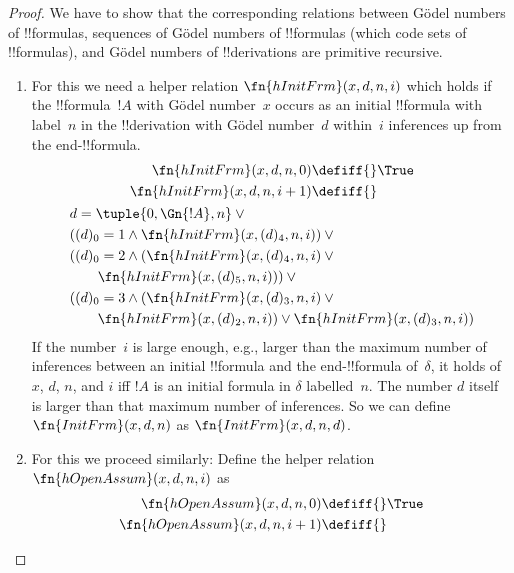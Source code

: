 \documentclass[../../include/open-logic-section]{subfiles}
\begin{document}
\begin{proof}
We have to show that the corresponding relations between G\"odel
numbers of !!{formula}s, sequences of G\"odel numbers of !!{formula}s
(which code sets of !!{formula}s), and G\"odel numbers of !!{derivation}s 
are primitive recursive.
\begin{enumerate}
\item For this we need a helper relation $\fn{hInitFrm}(x, d, n, i)$
  which holds if the !!{formula}~$!A$ with G\"odel number~$x$ occurs
  as an initial !!{formula} with label~$n$ in the !!{derivation} with
  G\"odel number~$d$ within~$i$ inferences up from the
  end-!!{formula}.
  \begin{multline*}
    \begin{aligned}
    \fn{hInitFrm}(x, d, n, 0) \defiff {} & \True\\   
    \fn{hInitFrm}(x, d, n, i+1) \defiff {} &
    \end{aligned}\\
    \begin{aligned}
&  d = \tuple{0, \Gn{!A}, n} \lor {}\\
      & ((d)_0 = 1 \land \fn{hInitFrm}(x, (d)_4, n, i)) \lor {}\\
      & ((d)_0 = 2 \land (\fn{hInitFrm}(x, (d)_4, n, i) \lor {}\\
      & \qquad\fn{hInitFrm}(x, (d)_5, n, i))) \lor {}\\
      & ((d)_0 = 3 \land (\fn{hInitFrm}(x, (d)_3, n, i) \lor {}\\
      & \qquad \fn{hInitFrm}(x, (d)_2, n, i)) \lor
      \fn{hInitFrm}(x, (d)_3, n, i))
\end{aligned}
  \end{multline*}
   If the number~$i$ is large enough, e.g., larger than the maximum
   number of inferences between an initial !!{formula} and the
   end-!!{formula} of~$\delta$, it holds of $x$, $d$, $n$, and $i$ iff
   $!A$ is an initial formula in $\delta$ labelled~$n$.  The number
   $d$ itself is larger than that maximum number of inferences.  So we
   can define $\fn{InitFrm}(x, d, n)$ as $\fn{InitFrm}(x,
   d, n, d)$.
\item For this we proceed similarly: Define the helper relation
  $\fn{hOpenAssum}(x, d, n, i)$ as
  \begin{multline*}
    \begin{aligned}
    \fn{hOpenAssum}(x, d, n, 0) \defiff {} & \True\\   
    \fn{hOpenAssum}(x, d, n, i+1) \defiff {} &
    \end{aligned}\\

\end{multline*}
\end{enumerate}
\end{proof}
\end{document}

